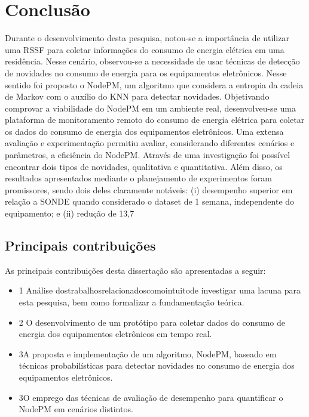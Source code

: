 
\chapter{Conclusão}

Durante o desenvolvimento desta pesquisa, notou-se a import\^{a}ncia de utilizar uma RSSF para coletar informa\c{c}\~{o}es do consumo de energia el\'{e}trica em uma resid\^{e}ncia. Nesse cen\'{a}rio, observou-se a necessidade de usar t\'{e}cnicas de detec\c{c}\~{a}o de novidades no consumo de energia para os equipamentos eletr\^{o}nicos. Nesse sentido foi proposto o NodePM, um algoritmo que considera a entropia da cadeia de Markov com o aux\'{i}lio do KNN para detectar novidades. Objetivando comprovar a viabilidade do NodePM em um ambiente real, desenvolveu-se uma plataforma de monitoramento remoto do consumo de energia el\'{e}trica para coletar os dados do consumo de energia dos equipamentos eletr\^{o}nicos.
Uma extensa avalia\c{c}\~{a}o e experimenta\c{c}\~{a}o permitiu avaliar, considerando diferentes cen\'{a}rios e par\^{a}metros, a efici\^{e}ncia do NodePM. Atrav\'{e}s de uma investiga\c{c}\~{a}o foi poss\'{i}vel encontrar dois tipos de novidades, qualitativa e quantitativa. Al\'{e}m disso, os resultados apresentados mediante o planejamento de experimentos foram promissores, sendo dois deles claramente not\'{a}veis: (i) desempenho superior em rela\c{c}\~{a}o a SONDE quando considerado o dataset de 1 semana, independente do equipamento; e (ii) redu\c{c}\~{a}o de 13,7%


\section{Principais contribui\c{c}\~{o}es}
As principais contribui\c{c}\~{o}es desta disserta\c{c}\~{a}o s\~{a}o apresentadas a seguir:
\begin{itemize}
	\item{1} An\'{a}lise dostrabalhosrelacionadoscomointuitode investigar uma lacuna para esta pesquisa, bem como formalizar a fundamenta\c{c}\~{a}o te\'{o}rica.
	\item{2} O desenvolvimento de um prot\'{o}tipo para coletar dados do consumo de energia dos equipamentos eletr\^{o}nicos em tempo real.
	\item{3}A proposta e implementa\c{c}\~{a}o de um algoritmo, NodePM, baseado em t\'{e}cnicas probabil\'{i}sticas para detectar novidades no consumo de energia dos equipamentos eletr\^{o}nicos.
	\item{3}O emprego das t\'{e}cnicas de avalia\c{c}\~{a}o de desempenho para quantificar o NodePM em cen\'{a}rios distintos.
\end{itemize}


